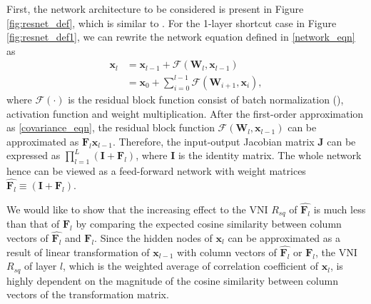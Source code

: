 First, the network architecture to be considered is present in Figure \ref{fig:resnet_def}, which is
similar to \cite{resnet2}. For the 1-layer shortcut case in Figure \ref{fig:resnet_def1}, we can
rewrite the network equation defined in \eqref{network_eqn} as
\begin{equation}
    \begin{aligned}
        \mathbf{x}_{l}&=\mathbf{x}_{l-1} + \mathcal{F}(\mathbf{W}_l, \mathbf{x}_{l-1})\\
        &=\mathbf{x}_{0} + \sum_{i=0}^{l-1}\mathcal{F}(\mathbf{W}_{i+1}, \mathbf{x}_{i}),
    \end{aligned}
\label{resnet_eqn}
\end{equation}
where $\mathcal{F}(\cdot)$ is the residual block function consist of batch normalization
(\cite{batchnorm}), activation function and weight multiplication.
After the first-order approximation as \eqref{covariance_eqn}, the residual block function
$\mathcal{F}(\mathbf{W}_l, \mathbf{x}_{l-1})$ can be approximated as $\mathbf{F}_l\mathbf{x}_{l-1}$.
Therefore, the input-output Jacobian matrix $\mathbf{J}$ can be expressed as
$\prod_{l=1}^{L}(\mathbf{I}+\mathbf{F}_l)$, where $\mathbf{I}$ is the identity matrix.
The whole network hence can be viewed as a feed-forward network with weight matrices
$\widehat{\mathbf{F}_l}\equiv(\mathbf{I}+\mathbf{F}_l)$. 

We would like to show that the increasing effect to the VNI $R_{sq}$ 
of $\widehat{\mathbf{F}_l}$ is much less than that of $\mathbf{F}_l$
by comparing the expected cosine similarity between column vectors of 
$\widehat{\mathbf{F}_l}$ and $\mathbf{F}_l$.
Since the hidden nodes of $\mathbf{x}_l$ can be approximated as a result of linear transformation of
$\mathbf{x}_{l-1}$ with column vectors of $\widehat{\mathbf{F}_l}$ or $\mathbf{F}_l$,
the VNI $R_{sq}$ of layer $l$, which is the weighted average of correlation coefficient of
$\mathbf{x}_l$, is highly dependent on the magnitude of the cosine similarity between column vectors
of the transformation matrix.

